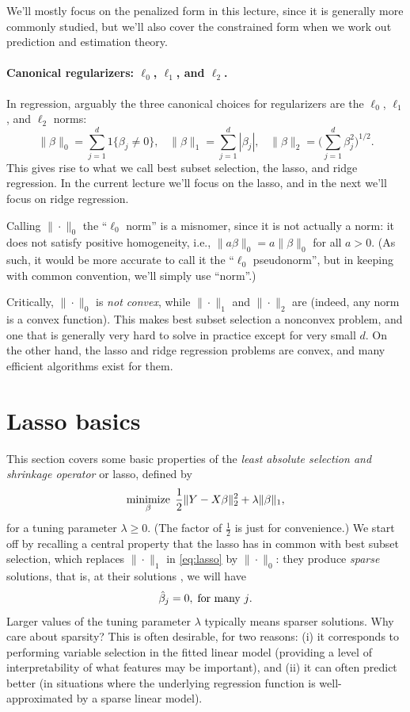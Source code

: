 \documentclass{article}
\begin{document}
We'll mostly focus on the penalized form in this lecture, since it is generally
more commonly studied, but we'll also cover the constrained form when we work
out prediction and estimation theory. 

\paragraph{Canonical regularizers: $\ell_0$, $\ell_1$, and $\ell_2$.}

In regression, arguably the three canonical choices for regularizers are the
$\ell_0$, $\ell_1$, and $\ell_2$ norms: 
\[
\|\beta\|_0 = \sum_{j=1}^d 1\{\beta_j \not= 0\}, \;\;\;
\|\beta\|_1 = \sum_{j=1}^d |\beta_j|, \;\;\;
\|\beta\|_2 = \bigg(\sum_{j=1}^d \beta_j^2 \bigg)^{1/2}.
\]
This gives rise to what we call best subset selection, the lasso, and ridge
regression. In the current lecture we'll focus on the lasso, and in the next
we'll focus on ridge regression.

Calling $\|\cdot\|_0$ the ``$\ell_0$ norm'' is a misnomer, since it is not
actually a norm: it does not satisfy positive homogeneity, i.e., $\|a\beta\|_0 = 
a\|\beta\|_0$ for all $a>0$. (As such, it would be more accurate to call it the
``$\ell_0$ pseudonorm'', but in keeping with common convention, we'll simply use
``norm''.)    

Critically, $\|\cdot\|_0$ is \emph{not convex}, while $\|\cdot\|_1$ and
$\|\cdot\|_2$ are (indeed, any norm is a convex function). This makes best
subset selection a nonconvex problem, and one that is generally very hard to
solve in practice except for very small $d$. On the other hand, the lasso and
ridge regression problems are convex, and many efficient algorithms exist for
them.    

\section{Lasso basics}

This section covers some basic properties of the \emph{least absolute selection
  and shrinkage operator} or lasso, defined by   
\begin{equation}
\label{eq:lasso}
\mathop{\mathrm{minimize}}_\beta \; \frac{1}{2} \|Y - X\beta\|_2^2 + \lambda \|\beta\|_1, 
\end{equation}
for a tuning parameter $\lambda \geq 0$. (The factor of $\frac{1}{2}$ is just
for convenience.) We start off by recalling a central property that the lasso
has in common with best subset selection, which replaces $\|\cdot\|_1$ in
\eqref{eq:lasso} by  $\|\cdot\|_0$: they produce \emph{sparse} solutions, that
is, at their solutions \smash{$\hbeta$}, we will have   
\[
\hat{\beta}_j = 0, \; \text{for many $j$}.
\]
Larger values of the tuning parameter $\lambda$ typically means sparser
solutions. Why care about sparsity? This is often desirable, for two reasons:
(i) it corresponds to performing variable selection in the fitted linear model
(providing a level of interpretability of what features may be important), and
(ii) it can often predict better (in situations where the underlying regression
function is well-approximated by a sparse linear model).
\end{document}
